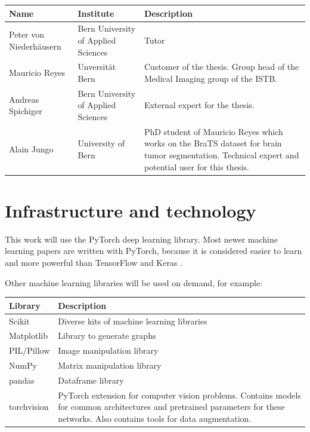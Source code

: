     \begin{tabular}{| p{4cm} | p{3.5cm} | p{8cm} |}
        \hline
        \textbf{Name} & \textbf{Institute} & \textbf{Description} \\ \hline
        Peter von Niederhäusern & Bern University of Applied Sciences & Tutor \\ \hline
        Mauricio Reyes & Unversität Bern & Customer of the thesis. Group head of the Medical Imaging group of the ISTB. \\ \hline
        Andreas Spichiger & Bern University of Applied Sciences & External expert for the thesis. \\ \hline
        Alain Jungo & University of Bern & PhD student of Mauricio Reyes which works on the BraTS dataset for brain tumor segmentation. Technical expert and potential user for this thesis. \\ \hline
    \end{tabular}

\chapter{Infrastructure and technology}
This work will use the PyTorch \cite{paszke2017automatic} deep learning library. Most newer machine learning papers are written with PyTorch, because it is considered easier to learn and more powerful than TensorFlow and Keras \cite{pytorchvstensorflow}.

Other machine learning libraries will be used on demand, for example:

\begin{tabular}{|p{3cm}|p{12.5cm}|}
    \hline
    \textbf{Library} & \textbf{Description} \\ \hline
    Scikit & Diverse kits of machine learning libraries \\ \hline
    Matplotlib & Library to generate graphs \\ \hline
    PIL/Pillow & Image manipulation library \\ \hline
    NumPy & Matrix manipulation library \\ \hline
    pandas & Dataframe library \\ \hline
    torchvision & PyTorch extension for computer vision problems. Contains models for common architectures and pretrained parameters for these networks. Also contains tools for data augmentation. \\ \hline
\end{tabular}

